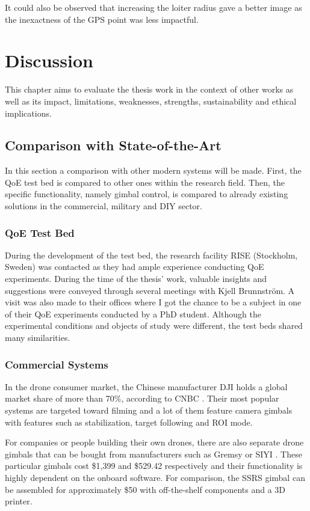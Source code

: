 \documentclass[nofilelist]{cslthse-msc}
\begin{document}
It could also be observed that increasing the loiter radius gave a better image as the inexactness of the GPS point was less impactful.

\chapter{Discussion}
This chapter aims to evaluate the thesis work in the context of other works as well as its impact, limitations, weaknesses, strengths, sustainability and ethical implications.

\section{Comparison with State-of-the-Art}
In this section a comparison with other modern systems will be made. First, the QoE test bed is compared to other ones within the research field. Then, the specific functionality, namely gimbal control, is compared to already existing solutions in the commercial, military and DIY sector.

\subsection{QoE Test Bed}
During the development of the test bed, the research facility RISE (Stockholm, Sweden) was contacted as they had ample experience conducting QoE experiments. During the time of the thesis' work, valuable insights and suggestions were conveyed through several meetings with Kjell Brunnström. A visit was also made to their offices where I got the chance to be a subject in one of their QoE experiments conducted by a PhD student. Although the experimental conditions and objects of study were different, the test beds shared many similarities. 

\subsection{Commercial Systems}
In the drone consumer market, the Chinese manufacturer DJI holds a global market share of more than 70\%, according to CNBC \cite{dji}. Their most popular systems are targeted toward filming and a lot of them feature camera gimbals with features such as stabilization, target following and ROI mode. 

For companies or people building their own drones, there are also separate drone gimbals that can be bought from manufacturers such as Gremsy \cite{gremsy} or SIYI \cite{siyi}. These particular gimbals cost \$1,399 and \$529.42 respectively and their functionality is highly dependent on the onboard software. For comparison, the SSRS gimbal can be assembled for approximately \$50 with off-the-shelf components and a 3D printer.
\end{document}
